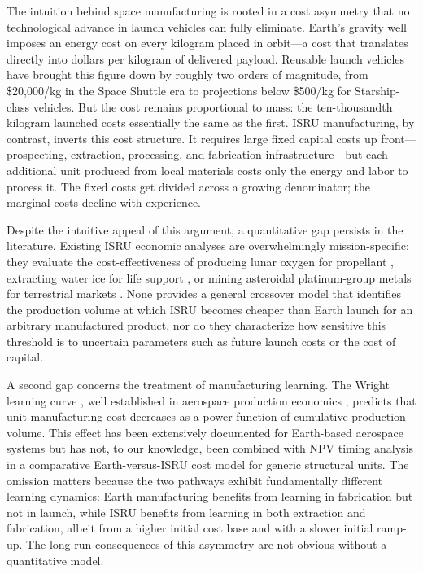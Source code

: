 \documentclass[preprint,12pt]{elsarticle}
\begin{document}
The intuition behind space manufacturing is rooted in a cost asymmetry that no technological advance in launch vehicles can fully eliminate. Earth's gravity well imposes an energy cost on every kilogram placed in orbit---a cost that translates directly into dollars per kilogram of delivered payload. Reusable launch vehicles have brought this figure down by roughly two orders of magnitude, from \$20{,}000/kg in the Space Shuttle era to projections below \$500/kg for Starship-class vehicles. But the cost remains proportional to mass: the ten-thousandth kilogram launched costs essentially the same as the first. ISRU manufacturing, by contrast, inverts this cost structure. It requires large fixed capital costs up front---prospecting, extraction, processing, and fabrication infrastructure---but each additional unit produced from local materials costs only the energy and labor to process it. The fixed costs get divided across a growing denominator; the marginal costs decline with experience.

Despite the intuitive appeal of this argument, a quantitative gap persists in the literature. Existing ISRU economic analyses are overwhelmingly mission-specific: they evaluate the cost-effectiveness of producing lunar oxygen for propellant \cite{sanders2015}, extracting water ice for life support \cite{zubrin1996}, or mining asteroidal platinum-group metals for terrestrial markets \cite{sonter1997,elvis2012}. None provides a general crossover model that identifies the production volume at which ISRU becomes cheaper than Earth launch for an arbitrary manufactured product, nor do they characterize how sensitive this threshold is to uncertain parameters such as future launch costs or the cost of capital.

A second gap concerns the treatment of manufacturing learning. The Wright learning curve \cite{wright1936}, well established in aerospace production economics \cite{wertz2011}, predicts that unit manufacturing cost decreases as a power function of cumulative production volume. This effect has been extensively documented for Earth-based aerospace systems \cite{argote1990,nagy2013} but has not, to our knowledge, been combined with NPV timing analysis in a comparative Earth-versus-ISRU cost model for generic structural units. The omission matters because the two pathways exhibit fundamentally different learning dynamics: Earth manufacturing benefits from learning in fabrication but not in launch, while ISRU benefits from learning in both extraction and fabrication, albeit from a higher initial cost base and with a slower initial ramp-up. The long-run consequences of this asymmetry are not obvious without a quantitative model.
\end{document}
